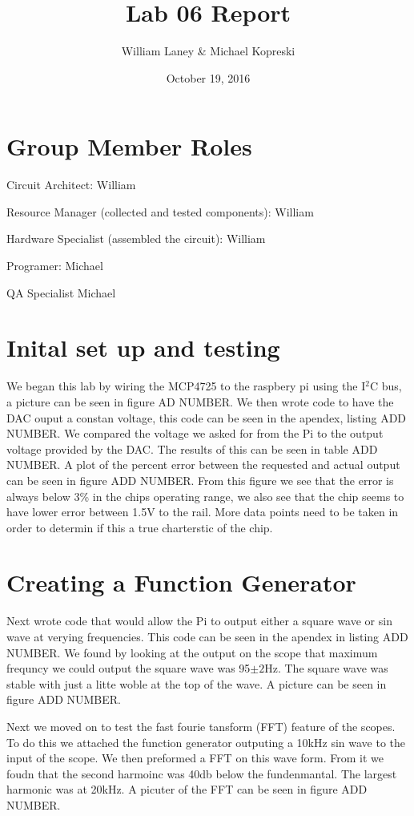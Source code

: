 \documentclass[prl,12pt,notitlepage,aps,onecolumn,superscriptaddress]{revtex4-1}
\begin{document}
\title{Lab 06 Report}
\author{William Laney \& Michael Kopreski}
\date{October 19, 2016}
\maketitle

\section{Group Member Roles}
Circuit Architect: William

Resource Manager (collected and tested components): William

Hardware Specialist (assembled the circuit): William

Programer: Michael

QA Specialist Michael

\section{Inital set up and testing}
We began this lab by wiring the MCP4725 to the raspbery pi using the I$^2$C bus, a picture can be seen in figure AD NUMBER. We then wrote code to have the DAC ouput a constan voltage, this code can be seen in the apendex, listing ADD NUMBER. We compared the voltage we asked for from the Pi to the output voltage provided by the DAC. The results of this can be seen in table ADD NUMBER. A plot of the percent error between the requested and actual output can be seen in figure ADD NUMBER. From this figure we see that the error is always below 3\% in the chips operating range, we also see that the chip seems to have lower error between 1.5V to the rail. More data points need to be taken in order to determin if this a true charterstic of the chip.

\section{Creating a Function Generator}
Next wrote code that would allow the Pi to output either a square wave or sin wave at verying frequencies. This code can be seen in the apendex in listing ADD NUMBER. We found by looking at the output on the scope that maximum frequncy we could output the square wave was 95$\pm2$Hz. The square wave was stable with just a litte woble at the top of the wave. A picture can be seen in figure ADD NUMBER.

Next we moved on to test the fast fourie tansform (FFT) feature of the scopes. To do this we attached the function generator outputing a 10kHz sin wave to the input of the scope. We then preformed a FFT on this wave form. From it we foudn that the second harmoinc was 40db below the fundenmantal. The largest harmonic was at 20kHz. A picuter of the FFT can be seen in figure ADD NUMBER.
\end{document}
